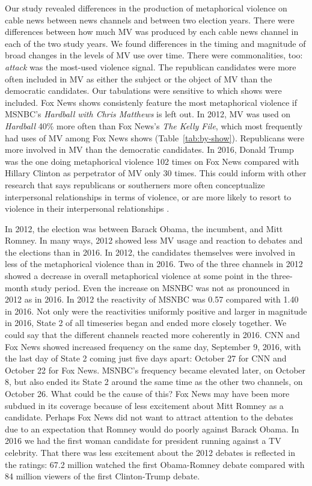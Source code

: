Our study revealed differences in the production of metaphorical
violence on cable news between news channels and between two 
election years. There were differences between how much MV was 
produced by each cable news channel in each of the two study years. We found
differences in the timing and magnitude of broad changes in the levels of
MV use over time. There were commonalities, too: \emph{attack} was the most-used 
violence signal. The republican candidates were more often included
in MV as either the subject or the object of MV than the democratic candidates.
Our tabulations were sensitive to which
shows were included. 
Fox News shows consistenly feature the most metaphorical violence if MSNBC's
\emph{Hardball with Chris Matthews} is left out. 
In 2012, MV was used on \emph{Hardball} 40\% more often than Fox News's \emph{The Kelly
File}, which most frequently had uses of MV among Fox News shows (Table~\ref{tab:by-show}).
Republicans were more involved in MV than the democratic candidates. 
In 2016, Donald Trump was the one doing
metaphorical violence 102 times on Fox News compared with Hillary Clinton as
perpetrator of MV only 30 times. 
This could inform with other research that says republicans or southerners 
more often conceptualize interpersonal relationships in terms of violence, or are
more likely to resort to violence in their interpersonal relationships 
\cite{Lakoff1996, Cohen1996}.

In 2012, the election was between Barack Obama, the incumbent, and Mitt Romney.
In many ways, 2012 showed less MV usage and reaction to debates and
the elections than in 2016.  
In 2012, the candidates themselves were involved in less of the metaphorical
violence than in 2016. Two of the three channels in 2012 showed a decrease in
overall metaphorical violence at some point in the three-month study period.
Even the increase on MSNBC was not as pronounced in 2012 as in 2016. In 2012
the reactivity of MSNBC was 0.57 compared with 1.40 in 2016. Not only were the
reactivities uniformly positive and larger in magnitude in 2016, State 2 of
all timeseries began and ended more closely together. We
could say that the different channels reacted more coherently in 2016.
CNN and Fox News showed increased frequency on the same day, September 9, 2016,
with the last day of State 2 coming just five days apart: October 27 for CNN
and October 22 for Fox News.  MSNBC's frequency became elevated later, 
on October 8, but also ended its State 2 around the same time as the
other two channels, on October 26. What could be the cause of this? 
Fox News may have been more subdued in its coverage because of less excitement
about Mitt Romney as a candidate. Perhaps Fox News did not want to attract
attention to the debates due to an expectation that Romney would do poorly
against Barack Obama. In 2016 we had the first woman candidate for president
running against a TV celebrity. That there was less excitement
about the 2012 debates is reflected in the ratings: 67.2 million watched 
the first Obama-Romney debate compared with 84 million viewers of the first
Clinton-Trump debate.

